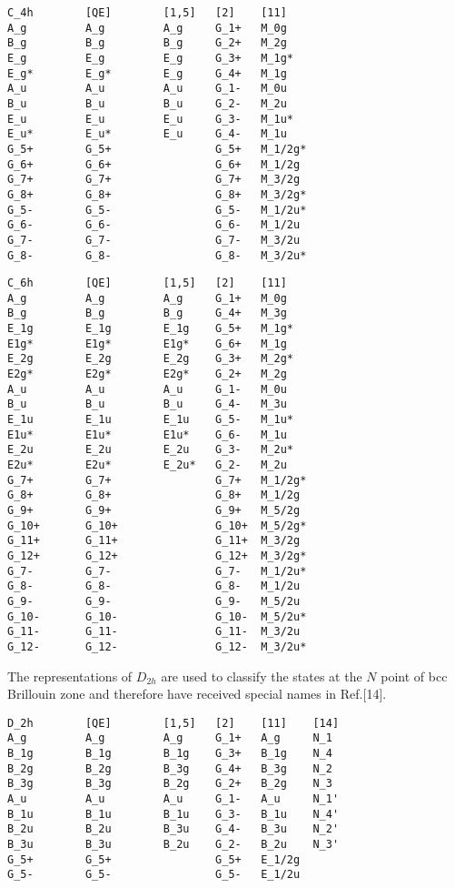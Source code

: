 \documentclass[12pt,a4paper]{article}
\begin{document}
\begin{verbatim}
C_4h        [QE]        [1,5]   [2]    [11]
A_g         A_g         A_g     G_1+   M_0g
B_g         B_g         B_g     G_2+   M_2g
E_g         E_g         E_g     G_3+   M_1g*
E_g*        E_g*        E_g     G_4+   M_1g
A_u         A_u         A_u     G_1-   M_0u
B_u         B_u         B_u     G_2-   M_2u
E_u         E_u         E_u     G_3-   M_1u*
E_u*        E_u*        E_u     G_4-   M_1u
G_5+        G_5+                G_5+   M_1/2g*
G_6+        G_6+                G_6+   M_1/2g
G_7+        G_7+                G_7+   M_3/2g
G_8+        G_8+                G_8+   M_3/2g*
G_5-        G_5-                G_5-   M_1/2u*
G_6-        G_6-                G_6-   M_1/2u
G_7-        G_7-                G_7-   M_3/2u
G_8-        G_8-                G_8-   M_3/2u*
\end{verbatim}

\begin{verbatim}
C_6h        [QE]        [1,5]   [2]    [11]
A_g         A_g         A_g     G_1+   M_0g
B_g         B_g         B_g     G_4+   M_3g
E_1g        E_1g        E_1g    G_5+   M_1g*
E1g*        E1g*        E1g*    G_6+   M_1g
E_2g        E_2g        E_2g    G_3+   M_2g*
E2g*        E2g*        E2g*    G_2+   M_2g
A_u         A_u         A_u     G_1-   M_0u
B_u         B_u         B_u     G_4-   M_3u
E_1u        E_1u        E_1u    G_5-   M_1u*
E1u*        E1u*        E1u*    G_6-   M_1u
E_2u        E_2u        E_2u    G_3-   M_2u*
E2u*        E2u*        E_2u*   G_2-   M_2u
G_7+        G_7+                G_7+   M_1/2g*
G_8+        G_8+                G_8+   M_1/2g
G_9+        G_9+                G_9+   M_5/2g
G_10+       G_10+               G_10+  M_5/2g*
G_11+       G_11+               G_11+  M_3/2g
G_12+       G_12+               G_12+  M_3/2g*
G_7-        G_7-                G_7-   M_1/2u*
G_8-        G_8-                G_8-   M_1/2u
G_9-        G_9-                G_9-   M_5/2u
G_10-       G_10-               G_10-  M_5/2u*
G_11-       G_11-               G_11-  M_3/2u
G_12-       G_12-               G_12-  M_3/2u*
\end{verbatim}

The representations of $D_{2h}$ are used to classify the states at the $N$
point of bcc Brillouin zone and therefore have received special names 
in Ref.[14].

\begin{verbatim}
D_2h        [QE]        [1,5]   [2]    [11]    [14]
A_g         A_g         A_g     G_1+   A_g     N_1
B_1g        B_1g        B_1g    G_3+   B_1g    N_4
B_2g        B_2g        B_3g    G_4+   B_3g    N_2
B_3g        B_3g        B_2g    G_2+   B_2g    N_3
A_u         A_u         A_u     G_1-   A_u     N_1'
B_1u        B_1u        B_1u    G_3-   B_1u    N_4'
B_2u        B_2u        B_3u    G_4-   B_3u    N_2'
B_3u        B_3u        B_2u    G_2-   B_2u    N_3'
G_5+        G_5+                G_5+   E_1/2g
G_5-        G_5-                G_5-   E_1/2u
\end{verbatim}
\end{document}
